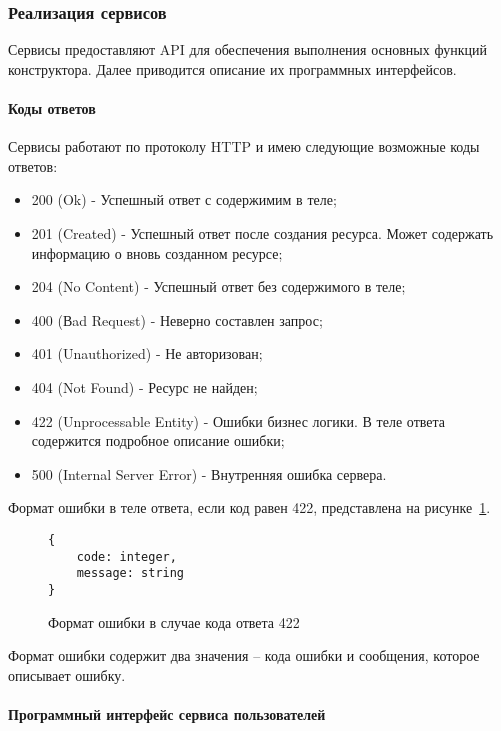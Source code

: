 \subsubsection{Реализация сервисов}

Сервисы предоставляют API для обеспечения выполнения основных функций конструктора.
Далее приводится описание их программных интерфейсов.

\paragraph{Коды ответов}

Сервисы работают по протоколу HTTP и имею следующие возможные
коды ответов:
\begin{itemize}
	\item 200 (Ok) - Успешный ответ с содержимим в теле;
	\item 201 (Created) - Успешный ответ после создания ресурса. Может
	      содержать информацию о вновь созданном ресурсе;
	\item 204 (No Content) - Успешный ответ без содержимого в теле;
	\item 400 (Вad Request) - Неверно составлен запрос;
	\item 401 (Unauthorized) - Не авторизован;
	\item 404 (Not Found) - Ресурс не найден;
	\item 422 (Unprocessable Entity) - Ошибки бизнес логики. В теле ответа
	      содержится подробное описание ошибки;
	\item 500 (Internal Server Error) - Внутренняя ошибка сервера.
\end{itemize}

Формат ошибки в теле ответа, если код равен 422, представлена на
рисунке~\ref{f:error-struct}.


\begin{figure}[ht]
	\centering
	\vspace{\toppaddingoffigure}
	\begin{lstlisting}
{
    code: integer,
    message: string
}
    \end{lstlisting}
	\caption{Формат ошибки в случае кода ответа 422}
	\label{f:error-struct}
\end{figure}

Формат ошибки содержит два значения – кода ошибки и сообщения,
которое описывает ошибку.

\paragraph{Программный интерфейс сервиса пользователей}

